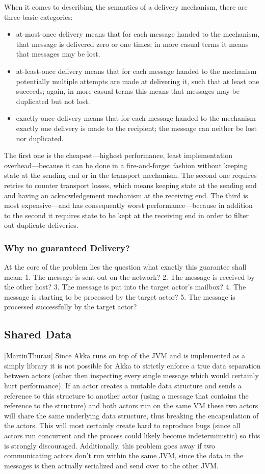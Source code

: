   When it comes to describing the semantics of a delivery mechanism, there are three basic categories:
  \begin{itemize}
  \item at-most-once delivery means that for each message handed to the mechanism, that message is delivered zero or one times; in more casual terms it means that messages may be lost.
  \item  at-least-once delivery means that for each message handed to the mechanism potentially multiple attempts are made at delivering it, such that at least one succeeds; again, in more casual terms this means that messages may be duplicated but not lost.
  \item  exactly-once delivery means that for each message handed to the mechanism exactly one delivery is made to the recipient; the message can neither be lost nor duplicated.
  \end{itemize}
  The first one is the cheapest—highest performance, least implementation overhead—because it can be done in a fire-and-forget fashion without keeping state at the sending end or in the transport mechanism. The second one requires retries to counter transport losses, which means keeping state at the sending end and having an acknowledgement mechanism at the receiving end. The third is most expensive—and has consequently worst performance—because in addition to the second it requires state to be kept at the receiving end in order to filter out duplicate deliveries.
\subsubsection{Why no guaranteed Delivery?}
At the core of the problem lies the question what exactly this guarantee shall mean: \cite{akkaJavaDoc}
1. The message is sent out on the network?
2. The message is received by the other host?
3. The message is put into the target actor’s mailbox?
4. The message is starting to be processed by the target actor?
5. The message is processed successfully by the target actor?

  \subsection{Shared Data}[MartinThurau]
  Since Akka runs on top of the JVM and is implemented as a simply library it is not possible for Akka to strictly enforce a true data separation between actors (other then inspecting every single message which would certainly hurt performance). If an actor creates a mutable data structure and sends a reference to this structure to another actor (using a message that contains the reference to the structure) and both actors run on the same VM these two actors will share the same underlying data structure, thus breaking the encapsulation of the actors. This will most certainly create hard to reproduce bugs (since all actors run concurrent and the process could likely become indeterministic) so this is strongly discouraged. Additionally, this problem goes away if two communicating actors don’t run within the same JVM, since the data in the messages is then actually serialized and send over to the other JVM.

